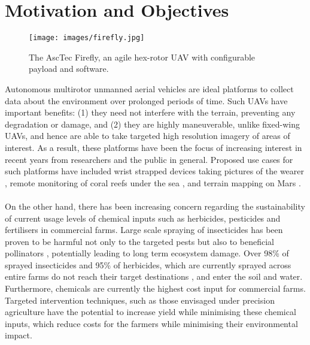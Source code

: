 \section{Motivation and Objectives}
\label{sec:Motivation and Objectives}

\begin{figure}[t]
 	 \centering
  	\texttt{[image: images/firefly.jpg]}
	  \caption{The AscTec Firefly, an agile hex-rotor UAV with configurable payload and software.}
	  \label{fig:firefly}
\end{figure}

Autonomous multirotor unmanned aerial vehicles are ideal platforms to collect data about the environment over prolonged periods of time. Such UAVs have important benefits: (1) they need not interfere with the terrain, preventing any degradation or damage, and (2) they are highly maneuverable, unlike fixed-wing UAVs, and hence are able to take targeted high resolution imagery of areas of interest. As a result, these platforms have been the focus of increasing interest in recent years from researchers and the public in general. Proposed use cases for such platforms have included wrist strapped devices taking pictures of the wearer \cite{Web:Nixie}, remote monitoring of coral reefs under the sea \cite{Web:fluidlensing}, and terrain mapping on Mars \cite{Web:nasadrone}.
\paragraph{}

On the other hand, there has been increasing concern regarding the sustainability of current usage levels of chemical inputs such as herbicides, pesticides and fertilisers in commercial farms. Large scale spraying of insecticides has been proven to be harmful not only to the targeted pests but also to beneficial pollinators \cite{hopwood2012neonicotinoids}, potentially leading to long term ecosystem damage. Over 98\% of sprayed insecticides and 95\% of herbicides, which are currently sprayed across entire farms do not reach their target destinations \cite{miller2014sustaining}, and enter the soil and water. Furthermore, chemicals are currently the highest cost input for commercial farms. Targeted intervention techniques, such as those envisaged under precision agriculture have the potential to increase yield while minimising these chemical inputs, which reduce costs for the farmers while minimising their environmental impact.

